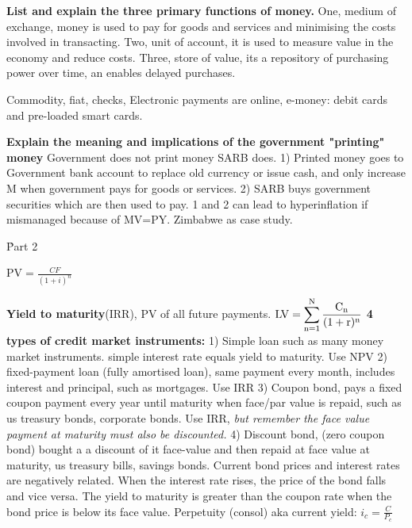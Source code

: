 \documentclass[12pt]{examnotes}
\begin{document}
\textbf{List and explain the three primary functions of money.}
One, medium of exchange, money is used to pay for goods and services and minimising the costs involved in transacting. Two, unit of account, it is used to measure value in the economy and reduce costs. Three, store of value, its a repository of purchasing power over time, an enables delayed purchases.

Commodity, fiat, checks, Electronic payments are online, e-money: debit cards and pre-loaded smart cards. 

\textbf{Explain the meaning and implications of the government "printing" money}
Government does not print money SARB does. 1) Printed money goes to Government bank account to replace old currency or issue cash, and only increase M when government pays for goods or services. 2) SARB buys government securities which are then used to pay. 1 and 2 can lead to hyperinflation if mismanaged because of MV=PY. Zimbabwe as case study.

\h{Part 2}


$\textrm{PV}=\displaystyle\frac{CF}{(1+i)^n}$ \quad

\textbf{Yield to maturity}(IRR), PV of all future payments. $\rm{LV} = \displaystyle\sum_{n=1}^{N} \frac{C_n}{(1+r)^{n}}$ 
\textbf{4 types of credit market instruments:} 
1) Simple loan such as many money market instruments. simple interest rate equals yield to maturity. Use NPV  
2) fixed-payment loan (fully amortised loan), same payment every month, includes interest and principal, such as mortgages. Use IRR 
3) Coupon bond, pays a fixed coupon payment every year until maturity when face/par value is repaid, such as us treasury bonds, corporate bonds. Use IRR, \emph{but remember the face value payment at maturity must also be discounted.}
4) Discount bond, (zero coupon bond) bought a a discount of it face-value and then repaid at face value at maturity, us treasury bills, savings bonds. 
Current bond prices and interest rates are negatively related. When the interest rate rises, the price of the bond falls and vice versa. The yield to  maturity is greater than the coupon rate when the bond price is below its face value. 
Perpetuity (consol) aka current yield: $i_c=\displaystyle\frac{C}{P_c}$ 
\end{document}
